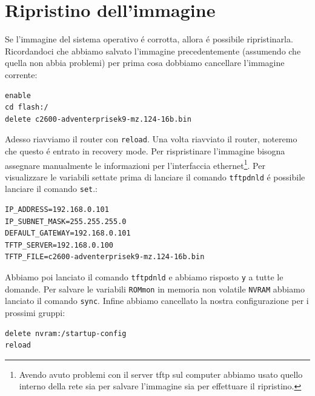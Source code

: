 \documentclass[9pt, a4paper, oneside]{article}
\begin{document}
		\section{Ripristino dell'immagine}
			\par
				Se l'immagine del sistema operativo \'e 
				corrotta, allora \'e possibile ripristinarla.
				Ricordandoci che abbiamo salvato l'immagine 
				precedentemente (assumendo che quella non 
				abbia problemi) per prima cosa dobbiamo 
				cancellare l'immagine corrente:
				\begin{verbatim}
enable
cd flash:/
delete c2600-adventerprisek9-mz.124-16b.bin
				\end{verbatim}
			\par
				Adesso riavviamo il router con \texttt{reload}.
				Una volta riavviato il router, noteremo che 
				questo \'e entrato in recovery mode. Per 
				rispristinare l'immagine bisogna assegnare 
				manualmente le informazioni per l'interfaccia 
				ethernet\footnote{Avendo avuto problemi con il 
				server tftp sul computer abbiamo usato quello 
				interno della rete sia per salvare l'immagine 
				sia per effettuare il ripristino.}. Per visualizzare le variabili settate prima di lanciare il comando \texttt{tftpdnld} \'e possibile 
				lanciare il comando \texttt{set}.:
				\begin{verbatim}
IP_ADDRESS=192.168.0.101
IP_SUBNET_MASK=255.255.255.0
DEFAULT_GATEWAY=192.168.0.101
TFTP_SERVER=192.168.0.100
TFTP_FILE=c2600-adventerprisek9-mz.124-16b.bin
				\end{verbatim}
				Abbiamo poi lanciato il comando 
				\texttt{tftpdnld} e abbiamo risposto \texttt{y} 
				a tutte le domande. Per salvare le variabili \texttt{ROMmon} in memoria non volatile \texttt{NVRAM} abbiamo lanciato il comando \texttt{sync}. Infine abbiamo 
				cancellato la nostra configurazione per i 
				prossimi gruppi:
				\begin{verbatim}
delete nvram:/startup-config
reload
				\end{verbatim}				
\end{document}
